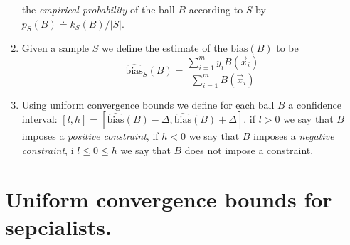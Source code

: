 \documentclass{article}
\newtheorem{theorem}{Theorem}[section]
\newcommand{\B}{{\cal B}}
\newcommand{\x}{\vec{x}}
\newcommand{\bias}{\text{bias}}
\newcommand{\ebias}{\widehat{\text{bias}}}
\newcommand{\samp}{S}
\begin{document}
\begin{enumerate}
    the {\em empirical probability} of the ball $B$ according to
    $\samp$ by $p_{\samp}(B) \doteq k_{\samp}(B)/|\samp|$.
  \item Given a sample $\samp$ we define the estimate of the
    $\bias(B)$ to be
    \[
    \ebias_{\samp}(B) = \frac{\sum_{i=1}^m y_i B(\x_i)}{\sum_{i=1}^m B(\x_i)}
    \]
  \item Using uniform convergence bounds we define for each ball $B$
    a confidence interval:
    $[l,h]=[\ebias(B)-\Delta,\ebias(B)+\Delta]$.
    if $l>0$ we say that $B$ imposes a {\em positive constraint}, if
    $h<0$ we say that $B$ imposes a {\em negative constraint}, i
    $l\leq 0 \leq h$ we say that $B$ does not impose a constraint.
\end{enumerate}

\section{Uniform convergence bounds for sepcialists.}
%
%
%
%
\end{document}
